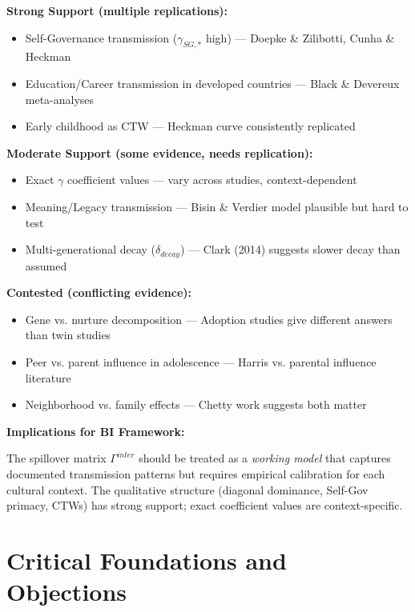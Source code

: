 \begin{tcolorbox}[colback=blue!5!white, colframe=blue!75!black,
    title=Evidence Assessment for Intergenerational Transmission]

\textbf{Strong Support (multiple replications):}
\begin{itemize}[nosep]
\item Self-Governance transmission ($\gamma_{SG,*}$ high) --- Doepke \& Zilibotti, Cunha \& Heckman
\item Education/Career transmission in developed countries --- Black \& Devereux meta-analyses
\item Early childhood as CTW --- Heckman curve consistently replicated
\end{itemize}

\textbf{Moderate Support (some evidence, needs replication):}
\begin{itemize}[nosep]
\item Exact $\gamma$ coefficient values --- vary across studies, context-dependent
\item Meaning/Legacy transmission --- Bisin \& Verdier model plausible but hard to test
\item Multi-generational decay ($\delta_{decay}$) --- Clark (2014) suggests slower decay than assumed
\end{itemize}

\textbf{Contested (conflicting evidence):}
\begin{itemize}[nosep]
\item Gene vs. nurture decomposition --- Adoption studies give different answers than twin studies
\item Peer vs. parent influence in adolescence --- Harris vs. parental influence literature
\item Neighborhood vs. family effects --- Chetty work suggests both matter
\end{itemize}

\textbf{Implications for BI Framework:}

The spillover matrix $\Gamma^{inter}$ should be treated as a \textit{working model} that captures
documented transmission patterns but requires empirical calibration for each cultural context.
The qualitative structure (diagonal dominance, Self-Gov primacy, CTWs) has strong support;
exact coefficient values are context-specific.
\end{tcolorbox}


\section{Critical Foundations and Objections}
\label{sec:BI-foundations}

